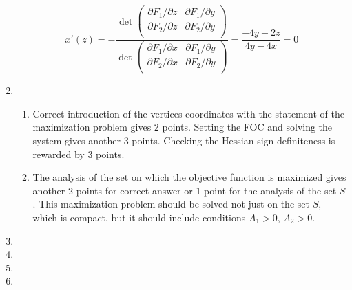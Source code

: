 \begin{enumerate}
    \[    
    x'(z) = - \frac{\det \begin{pmatrix}  
       \partial F_1/\partial z & \partial F_1 / \partial y \\
       \partial F_2/\partial z & \partial F_2 / \partial y \\
    \end{pmatrix}}{\det \begin{pmatrix}
        \partial F_1/\partial x & \partial F_1 / \partial y \\
        \partial F_2/\partial x & \partial F_2 / \partial y \\         
    \end{pmatrix}} = \frac{-4y + 2z}{4y-4x} = 0
    \]
    \item \begin{enumerate}
        \item  Correct introduction of the vertices coordinates with the statement of the maximization problem gives 2 points. 
    Setting the FOC and solving the system gives another 3 points. 
    Checking the Hessian sign definiteness is rewarded by 3 points. 
    \item The analysis of the set on which the objective function is maximized gives another 2 points for correct answer 
    or 1 point for the analysis of the set $S$. 
    This maximization problem should be solved not just on the set $S$, which is compact, but it should include conditions $A_1 >0$, $A_2 > 0$.
\end{enumerate}
    
    \item 
    \item 
    \item 
    \item 
\end{enumerate}
